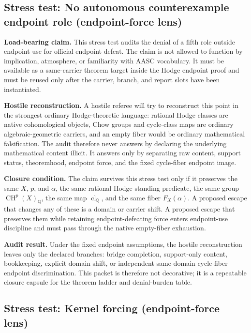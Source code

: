 \documentclass[11pt]{article}
\newcommand{\QQ}{\mathbb{Q}}
\newcommand{\CH}{\operatorname{CH}}
\newcommand{\clQ}{\operatorname{cl}_{\QQ}}
\begin{document}
\subsection{Stress test: No autonomous counterexample endpoint role (endpoint-force lens)}

\par\noindent\textbf{Load-bearing claim.} This stress test audits the denial of a fifth role outside endpoint use for official endpoint defeat. The claim is not allowed to function by implication, atmosphere, or familiarity with AASC vocabulary. It must be available as a same-carrier theorem target inside the Hodge endpoint proof and must be reused only after the carrier, branch, and report slots have been instantiated.

\par\noindent\textbf{Hostile reconstruction.} A hostile referee will try to reconstruct this point in the strongest ordinary Hodge-theoretic language: rational Hodge classes are native cohomological objects, Chow groups and cycle-class maps are ordinary algebraic-geometric carriers, and an empty fiber would be ordinary mathematical falsification. The audit therefore never answers by declaring the underlying mathematical content illicit. It answers only by separating raw content, support status, theoremhood, endpoint force, and the fixed cycle-fiber endpoint image.

\par\noindent\textbf{Closure condition.} The claim survives this stress test only if it preserves the same $X$, $p$, and $\alpha$, the same rational Hodge-standing predicate, the same group $\CH^p(X)_\QQ$, the same map $\clQ$, and the same fiber $F_X(\alpha)$. A proposed escape that changes any of these is a domain or carrier shift. A proposed escape that preserves them while retaining endpoint-defeating force enters endpoint-use discipline and must pass through the native empty-fiber exhaustion.

\par\noindent\textbf{Audit result.} Under the fixed endpoint assumptions, the hostile reconstruction leaves only the declared branches: bridge completion, support-only content, bookkeeping, explicit domain shift, or independent same-domain cycle-fiber endpoint discrimination. This packet is therefore not decorative; it is a repeatable closure capsule for the theorem ladder and denial-burden table.


\subsection{Stress test: Kernel forcing (endpoint-force lens)}
\end{document}
